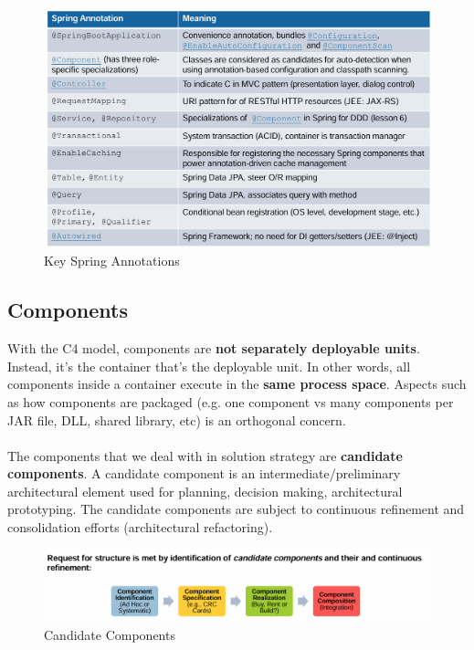 \documentclass[../Main.tex]{subfiles}
\begin{document}
\begin{figure}[H]
    \centering
    \includegraphics[width=1\linewidth]{Images/spring-boot-annotations.png}
    \caption{Key Spring Annotations}
\end{figure}

\subsection{Components}
With the C4 model, components are \textbf{not separately deployable units}.
Instead, it's the container that's the deployable unit. In other words,
all components inside a container execute in the \textbf{same process space}.
Aspects such as how components are packaged (e.g. one component vs
many components per JAR file, DLL, shared library, etc) is an
orthogonal concern.
\\\\
The components that we deal with in solution strategy are \textbf{candidate components}.
A candidate component is an intermediate/preliminary architectural element
used for planning, decision making, architectural prototyping.
The candidate components are subject to continuous refinement and
consolidation efforts (architectural refactoring).

\begin{figure}[H]
    \centering
    \includegraphics[width=1\linewidth]{Images/candidatecomponents.png}
    \caption{Candidate Components}
\end{figure}
\end{document}
